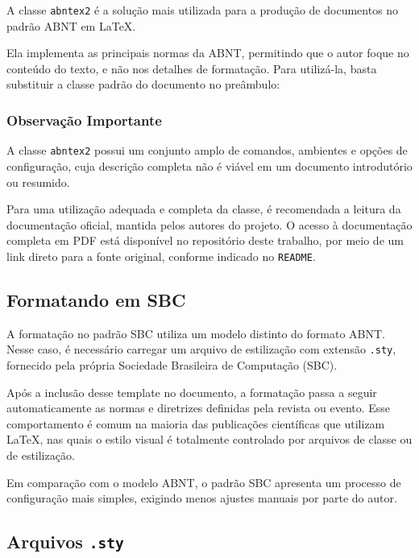 \documentclass{article}
\begin{document}
A classe \texttt{abntex2} é a solução mais utilizada para a produção de documentos no padrão ABNT em \LaTeX. 

Ela implementa as principais normas da ABNT, permitindo que o autor foque no conteúdo do texto, e não nos detalhes de formatação. Para utilizá-la, basta substituir a classe padrão do documento no preâmbulo:



\subsubsection{Observação Importante}

A classe \texttt{abntex2} possui um conjunto amplo de comandos, ambientes e opções de configuração, cuja descrição completa não é viável em um documento introdutório ou resumido.

Para uma utilização adequada e completa da classe, é recomendada a leitura da documentação oficial, mantida pelos autores do projeto. O acesso à documentação completa em PDF está disponível no repositório deste trabalho, por meio de um link direto para a fonte original, conforme indicado no \texttt{README}.

\subsection{Formatando em SBC}

A formatação no padrão SBC utiliza um modelo distinto do formato ABNT. Nesse caso, é necessário carregar um arquivo de estilização com extensão \texttt{.sty}, fornecido pela própria Sociedade Brasileira de Computação (SBC).

Após a inclusão desse template no documento, a formatação passa a seguir automaticamente as normas e diretrizes definidas pela revista ou evento. Esse comportamento é comum na maioria das publicações científicas que utilizam \LaTeX, nas quais o estilo visual é totalmente controlado por arquivos de classe ou de estilização.

Em comparação com o modelo ABNT, o padrão SBC apresenta um processo de configuração mais simples, exigindo menos ajustes manuais por parte do autor.

\subsection{Arquivos \texttt{.sty}}
\end{document}
